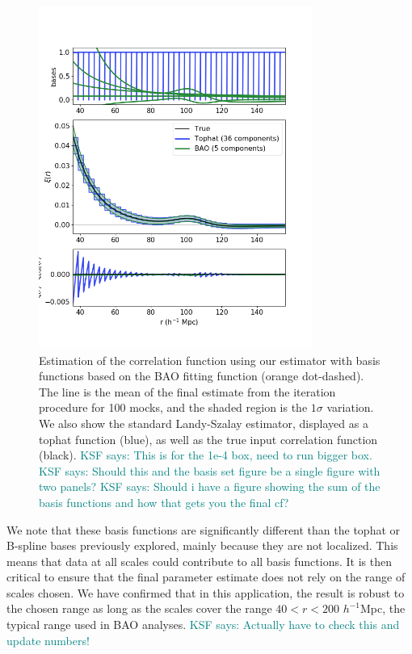 \documentclass[modern]{aastex62}
\newcommand{\hmpc}{$h^{-1}$Mpc}
\newcommand{\KSF}[1]{\textcolor{teal}{KSF says: #1}}
\begin{document}
\label{fig:bao}
\begin{figure}[th]
\centering
    \includegraphics[width=0.8\textwidth]{xicomparison_2e-4_tophat3_baoiter}
    \caption{Estimation of the correlation function using our estimator with basis functions based on the BAO fitting function (orange dot-dashed). The line is the mean of the final estimate from the iteration procedure for 100 mocks, and the shaded region is the $1\sigma$ variation. We also show the standard Landy-Szalay estimator, displayed as a tophat function (blue), as well as the true input correlation function (black). \KSF{This is for the 1e-4 box, need to run bigger box.} \KSF{Should this and the basis set figure be a single figure with two panels?} \KSF{Should i have a figure showing the sum of the basis functions and how that gets you the final cf?}}
\end{figure}

We note that these basis functions are significantly different than the tophat or B-spline bases previously explored, mainly because they are not localized.
This means that data at all scales could contribute to all basis functions.
It is then critical to ensure that the final parameter estimate does not rely on the range of scales chosen.
We have confirmed that in this application, the result is robust to the chosen range as long as the scales cover the range $40<r<200$ \hmpc, the typical range used in BAO analyses. \KSF{Actually have to check this and update numbers!}
\end{document}
